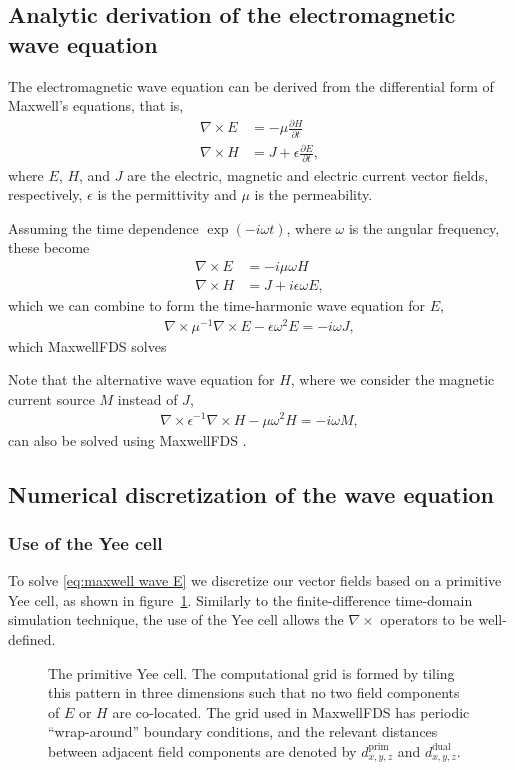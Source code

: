 \documentclass{article}
\newcommand{\E}[2]{\begin{align}#2\label{eq:#1}\end{align}}
\newcommand{\EE}[2]{\begin{subequations}\begin{align}#2\end{align}\label{eq:#1}\end{subequations}}
\newcommand{\curl}{\nabla\times}
\newcommand{\eq}[1]{\eqref{eq:#1}}
\newcommand{\fig}[1]{figure~\ref{fig:#1}}
\newcommand{\MaxwellFDS}{MaxwellFDS }
\newcommand{\prim}{\text{prim}}
\newcommand{\dual}{\text{dual}}
\begin{document}
\subsection{Analytic derivation of the electromagnetic wave equation}
The electromagnetic wave equation can be derived from 
    the differential form of Maxwell's equations, that is,
\EE {maxwell diff}
    {\curl E &= - \mu \frac{\partial H}{\partial t} \\
    \curl H &= J + \epsilon \frac{\partial E}{\partial t}, }
    where $E$, $H$, and $J$ are 
    the electric, magnetic and electric current
    vector fields, respectively,
    $\epsilon$ is the permittivity
    and $\mu$ is the permeability.

Assuming the time dependence $\exp(-i \omega t)$, 
    where $\omega$ is the angular frequency,
    these become
\EE {maxwell harmonic}
    {\curl E &= - i \mu \omega H \\
    \curl H &= J + i \epsilon \omega E,}
    which we can combine to form the time-harmonic wave equation for $E$,
    \E{maxwell wave E}
    {\curl \mu^{-1} \curl E - \epsilon \omega^2 E = -i \omega J,}
    which \MaxwellFDS solves

Note that the alternative wave equation for $H$,
    where we consider the magnetic current source $M$
    instead of $J$,
\E  {maxwell wave H}
    {\curl \epsilon^{-1} \curl H - \mu \omega^2 H = -i \omega M,}
    can also be solved using \MaxwellFDS.

\subsection{Numerical discretization of the wave equation}
\subsubsection{Use of the Yee cell}
To solve \eq{maxwell wave E} we discretize our vector fields 
    based on a primitive Yee cell, as shown in \fig{yee cell}. %
Similarly to the finite-difference time-domain simulation technique,
    the use of the Yee cell allows the $\curl$ operators to be well-defined.

\begin{figure}[ht]\begin{center}
    
    \end{center}
    \caption{   The primitive Yee cell. 
                The computational grid is formed by tiling this pattern
                    in three dimensions such that no two field components
                    of $E$ or $H$ are co-located. %
                The grid used in \MaxwellFDS has periodic ``wrap-around''
                    boundary conditions, and 
                    the relevant distances between adjacent field components
                    are denoted by $d^\prim_{x,y,z}$ and 
                    $d^\dual_{x,y,z}$.}
    \label{fig:yee cell}
\end{figure}
\end{document}
